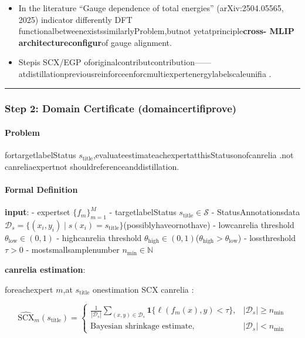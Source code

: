\documentclass[
  12pt,
]{article}
\providecommand{\tightlist}{%
  \setlength{\itemsep}{0pt}\setlength{\parskip}{0pt}}
\begin{document}
\begin{itemize}
\tightlist
\item
  In the literature ``Gauge dependence of total energies'' (arXiv:2504.05565, 2025)
  indicator differently DFT functionalbetweenexistssimilarlyProblem,butnot yetatprinciple\textbf{cross- MLIP architectureconfigur}of gauge
  alignment.
\item
   Stepis SCX/EGP oforiginalcontributcontribution------atdistillationpreviousreinforceenforcmultiexpertenergylabelscaleunifia .
\end{itemize}

\begin{center}\rule{0.5\linewidth}{0.5pt}\end{center}

\subsubsection{Step 2: Domain Certificate
(domaincertifiprove)}\label{step-2-domain-certificate-ux57dfux8ba4ux8bc1}

\paragraph{Problem}\label{ux95eeux9898-1}

fortargetlabelStatus
\(s_{\text{title}}\),evaluateestimateachexpertatthisStatusonofcanrelia .not canreliaexpertnot shouldreferenceanddistillation.

\paragraph{Formal Definition}\label{ux5f62ux5f0fux5316ux5b9aux4e49-1}

\textbf{input}: - expertset \(\{f_m\}_{m=1}^M\) - targetlabelStatus
\(s_{\text{title}} \in \mathcal{S}\) - StatusAnnotationsdata
\(\mathcal{D}_{s} = \{(x_i, y_i) \mid s(x_i) = s_{\text{title}}\}\)(possiblyhaveornothave)
- lowcanrelia threshold \(\theta_{\text{low}} \in (0, 1)\) - highcanrelia threshold
\(\theta_{\text{high}} \in (0, 1)\)(\(\theta_{\text{high}} > \theta_{\text{low}}\))
- lossthreshold \(\tau > 0\) - mostsmallsamplenumber \(n_{\min} \in \mathbb{N}\)

\textbf{canrelia estimation}:

foreachexpert \(m\),at \(s_{\text{title}}\) onestimation SCX canrelia :

\[\widehat{\text{SCX}}_m(s_{\text{title}}) = \begin{cases}
\displaystyle \frac{1}{|\mathcal{D}_{s}|} \sum_{(x, y) \in \mathcal{D}_{s}} \mathbf{1}\{\ell(f_m(x), y) < \tau\}, & |\mathcal{D}_{s}| \ge n_{\min} \\[1.5em]
\text{Bayesian shrinkage estimate}, & |\mathcal{D}_{s}| < n_{\min}
\end{cases}\]
\end{document}
